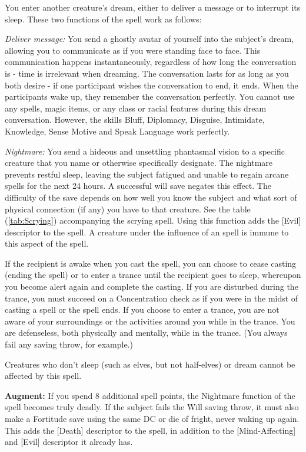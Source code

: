 You enter another creature's dream, either to deliver a message or to interrupt its sleep. These two functions of the spell work as follows:
\begin{list}{}{\leftmargin=1em}
 \item \emph{Deliver message:} You send a ghostly avatar of yourself into the subject's dream, allowing you to communicate as if you were standing face to face.
 This communication happens instantaneously, regardless of how long the conversation is - time is irrelevant when dreaming.
 The conversation lasts for as long as you both desire - if one participant wishes the conversation to end, it ends.
 When the participants wake up, they remember the conversation perfectly.
 You cannot use any spells, magic items, or any class or racial features during this dream conversation. 
 However, the skills Bluff, Diplomacy, Disguise, Intimidate, Knowledge, Sense Motive and Speak Language work perfectly.
 \item \emph{Nightmare:} You send a hideous and unsettling phantasmal vision to a specific creature that you name or otherwise specifically designate.
 The nightmare prevents restful sleep, leaving the subject fatigued and unable to regain arcane spells for the next 24 hours. 
 A successful will save negates this effect.
 The difficulty of the save depends on how well you know the subject and what sort of physical connection (if any) you have to that creature.
 See the table (\ref{tab:Scrying}) accompanying the scrying spell.
 Using this function adds the [Evil] descriptor to the spell.
 A creature under the influence of an  spell is immune to this aspect of the spell.
\end{list}
If the recipient is awake when you cast the spell, you can choose to cease casting (ending the spell) or to enter a trance until the recipient goes to sleep, 
whereupon you become alert again and complete the casting. If you are disturbed during the trance, 
you must succeed on a Concentration check as if you were in the midst of casting a spell or the spell ends. 
If you choose to enter a trance, you are not aware of your surroundings or the activities around you while in the trance.
You are defenseless, both physically and mentally, while in the trance. (You always fail any saving throw, for example.)

Creatures who don't sleep (such as elves, but not half-elves) or dream cannot be affected by this spell. 

\textbf{Augment:} If you spend 8 additional spell points, the Nightmare function of the spell becomes truly deadly.
If the subject fails the Will saving throw, it must also make a Fortitude save using the same DC or die of fright, never waking up again.
This adds the [Death] descriptor to the spell, in addition to the [Mind-Affecting] and [Evil] descriptor it already has.
